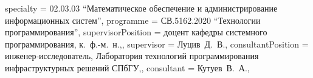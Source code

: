 {    specialty          = {02.03.03 \enquote{Математическое обеспечение и администрирование информационных систем}},
    programme          = {СВ.5162.2020 \enquote{Технологии программирования}},
    supervisorPosition = {доцент кафедры системного программирования, к.~ф.-м.~н.,},
    supervisor         = {Луцив~Д.~В.},
    consultantPosition = {инженер-исследователь, Лаборатория технологий программирования инфраструктурных решений СПбГУ,},
    consultant         = {Кутуев~В.~А.},
}

